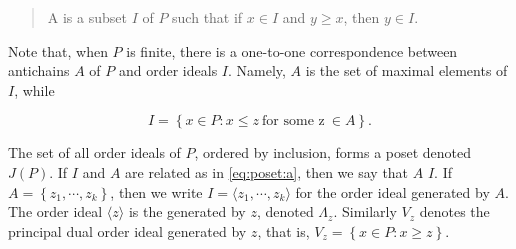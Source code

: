 \begin{quotation}
	A  is a subset $I$ of $P$ such that if $x \in I$ and $y \ge x$, then $y \in I$.
\end{quotation}

Note that, when $P$ is finite, there is a one-to-one correspondence between antichains $A$ of $P$ and order ideals $I$. Namely, $A$ is the set of maximal elements of $I$, while

\begin{equation}
\label{eq:poset:a}
I = \left\{{x \in P : x \le z ~\text{for some z}~ \in A}\right\}.
\end{equation}

The set of all order ideals of $P$, ordered by inclusion, forms a poset denoted $J(P)$. If $I$ and $A$ are related as in \ref{eq:poset:a}, then we say that $A$  $I$. If $A = \left\{{z_1 , \cdots , z_k}\right\}$, then we write $I = \langle z_1 , \cdots , z_k \rangle$ for the order ideal generated by $A$. The order ideal $\langle z \rangle$ is the  generated by $z$, denoted $\Lambda_z$. Similarly $V_z$ denotes the principal dual order ideal generated by $z$, that is, $V_z = \left\{{x \in P : x \ge z}\right\}$.

